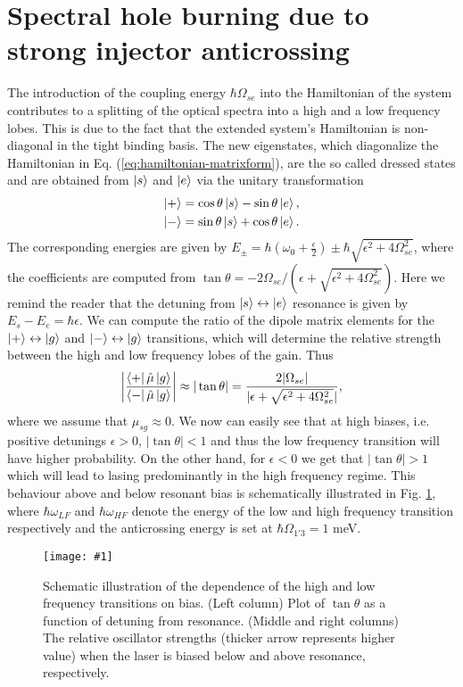 \documentclass[]{spie}  %
\newcommand{\includegraphicsXL}[1]{\texttt{[image: \#1]}}
\begin{document}
 \section{Spectral hole burning due to strong injector anticrossing}
 
 The introduction of the coupling energy $\hbar \Omega_{se}$ into the Hamiltonian of the system contributes to a splitting of the optical spectra into a high and a low frequency lobes. This is due to the fact that the extended system's Hamiltonian is non-diagonal in the tight binding basis. The new eigenstates, which diagonalize the Hamiltonian in Eq. (\ref{eq:hamiltonian-matrixform}), are the so called dressed states and are obtained from $\Ket{s}$ and $\Ket{e}$ via the unitary transformation
 \begin{align}
 \label{eq:dressedstates}
 \Ket{+} &= \cos\theta \Ket{s} - \sin\theta \Ket{e}, \nonumber \\
 \Ket{-} &= \sin\theta \Ket{s} + \cos\theta \Ket{e}.
 \end{align}
 The corresponding energies are given by $E_\pm =\hbar(\omega_0 +\frac{\epsilon}{2}) \pm \hbar\sqrt{\epsilon^2+4\Omega_{se}^2}$, where the coefficients are computed from  
 $
 \tan \theta = -2\Omega_{se}/(\epsilon+\sqrt{\epsilon^2+4\Omega_{se}^2}).
 $
 Here we remind the reader that the detuning from $\Ket {s}\leftrightarrow\Ket{e}$ resonance is given by $E_{s} - E_{e} = \hbar\epsilon$. We can compute the ratio of the dipole matrix elements for the $\Ket{+}\leftrightarrow\Ket{g}$ and $\Ket{-}\leftrightarrow\Ket{g}$ transitions, which will determine the relative strength between the high and low frequency lobes of the gain. Thus
 \begin{align}
 \label{eq:dresseddipoles}
 \left |\frac{\Bra{+}\hat{\mu}\Ket{g}}{\Bra{-}\hat{\mu}\Ket{g}}\right | \approx |\tan\theta| =  \frac{2|\Omega_{se}|}{|\epsilon+\sqrt{\epsilon^2+4\Omega_{se}^2}|},
 \end{align}
 where we assume that $\mu_{sg} \approx 0$.
 We now can easily see that at high biases, i.e. positive detunings $\epsilon >0$, $|\tan\theta|<1$ and thus the low frequency transition will have higher probability. On the other hand, for $\epsilon < 0 $ we get that $|\tan\theta| >1$ which will lead to lasing predominantly in the high frequency regime. This behaviour above and below resonant bias is schematically illustrated in Fig. \ref{fig:detuning}, where $\hbar\omega_{LF} $ and $\hbar\omega_{HF}$ denote the energy of the low and high frequency transition respectively and the anticrossing energy is set at $\hbar \Omega_{1'3} = 1$ meV.  
 \label{sec:biasdependence}
 \begin{figure}[h!]
 	\begin{center}
 		\includegraphicsXL{IMGs/BIASDETUNING.eps}
 		\caption{ Schematic illustration of the dependence of the high and low frequency transitions on bias. (Left column) Plot of $\tan\theta$ as a function of detuning from resonance. (Middle and right columns) The relative oscillator strengths (thicker arrow represents higher value) when the laser is biased below and above resonance, respectively. } \label{fig:detuning}
 	\end{center}	
 \end{figure}
\end{document}

